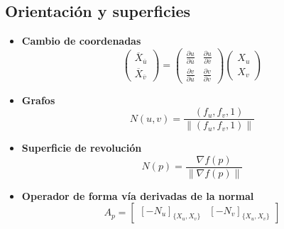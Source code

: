 \documentclass[10pt]{article}
\begin{document}
\begin{multicols}{3}
\section*{Orientación y superficies}
\begin{itemize}
  \item \textbf{Cambio de coordenadas}
  \[
  \begin{pmatrix}
    \overline{X}_{\overline{u}} \\
    \overline{X}_{\overline{v}}
  \end{pmatrix}
  =
  \begin{pmatrix}
    \frac{\partial u}{\partial \overline{u}} & \frac{\partial u}{\partial \overline{v}} \\
    \frac{\partial v}{\partial \overline{u}} & \frac{\partial v}{\partial \overline{v}}
  \end{pmatrix}
  \begin{pmatrix}
    X_{u} \\
    X_{v}
  \end{pmatrix}
  \]

  \item \textbf{Grafos} 
  \[
  N(u,v)=\frac{(f_{u}, f_{v}, 1)}{\|(f_{u}, f_{v}, 1)\|}
  \]

  \item \textbf{Superficie de revolución} 
  \[
  N(p)=\frac{\nabla f(p)}{\|\nabla f(p)\|}
  \]

  \item \textbf{Operador de forma vía derivadas de la normal} 
  \[
  A_p =
  \begin{bmatrix}
    \left[ -N_u \right]_{\{X_u, X_v\}} &
    \left[ -N_v \right]_{\{X_u, X_v\}}
  \end{bmatrix}
  \]
\end{itemize}

\end{multicols}
\end{document}
